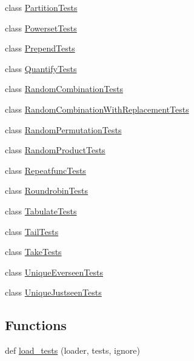\begin{DoxyCompactItemize}
\item 
class \hyperlink{classmore__itertools_1_1tests_1_1test__recipes_1_1_partition_tests}{Partition\+Tests}
\item 
class \hyperlink{classmore__itertools_1_1tests_1_1test__recipes_1_1_powerset_tests}{Powerset\+Tests}
\item 
class \hyperlink{classmore__itertools_1_1tests_1_1test__recipes_1_1_prepend_tests}{Prepend\+Tests}
\item 
class \hyperlink{classmore__itertools_1_1tests_1_1test__recipes_1_1_quantify_tests}{Quantify\+Tests}
\item 
class \hyperlink{classmore__itertools_1_1tests_1_1test__recipes_1_1_random_combination_tests}{Random\+Combination\+Tests}
\item 
class \hyperlink{classmore__itertools_1_1tests_1_1test__recipes_1_1_random_combination_with_replacement_tests}{Random\+Combination\+With\+Replacement\+Tests}
\item 
class \hyperlink{classmore__itertools_1_1tests_1_1test__recipes_1_1_random_permutation_tests}{Random\+Permutation\+Tests}
\item 
class \hyperlink{classmore__itertools_1_1tests_1_1test__recipes_1_1_random_product_tests}{Random\+Product\+Tests}
\item 
class \hyperlink{classmore__itertools_1_1tests_1_1test__recipes_1_1_repeatfunc_tests}{Repeatfunc\+Tests}
\item 
class \hyperlink{classmore__itertools_1_1tests_1_1test__recipes_1_1_roundrobin_tests}{Roundrobin\+Tests}
\item 
class \hyperlink{classmore__itertools_1_1tests_1_1test__recipes_1_1_tabulate_tests}{Tabulate\+Tests}
\item 
class \hyperlink{classmore__itertools_1_1tests_1_1test__recipes_1_1_tail_tests}{Tail\+Tests}
\item 
class \hyperlink{classmore__itertools_1_1tests_1_1test__recipes_1_1_take_tests}{Take\+Tests}
\item 
class \hyperlink{classmore__itertools_1_1tests_1_1test__recipes_1_1_unique_everseen_tests}{Unique\+Everseen\+Tests}
\item 
class \hyperlink{classmore__itertools_1_1tests_1_1test__recipes_1_1_unique_justseen_tests}{Unique\+Justseen\+Tests}
\end{DoxyCompactItemize}
\subsection*{Functions}
\begin{DoxyCompactItemize}
\item 
def \hyperlink{namespacemore__itertools_1_1tests_1_1test__recipes_a3221763da7a49533480b34e63ba3b967}{load\+\_\+tests} (loader, tests, ignore)
\end{DoxyCompactItemize}


